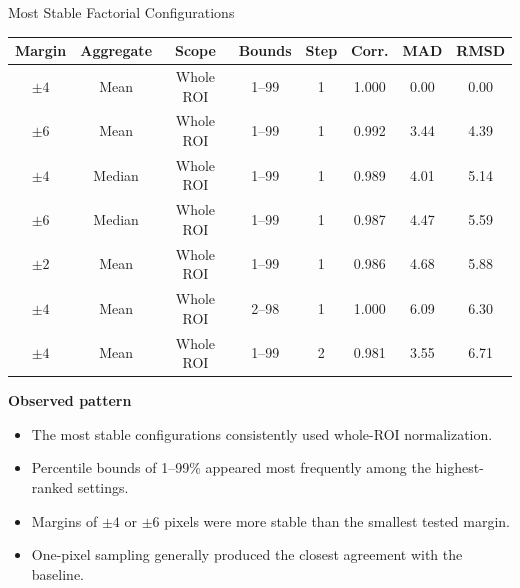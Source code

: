 \documentclass[aspectratio=169]{beamer}
\begin{document}
\begin{frame}{Most Stable Factorial Configurations}

\scriptsize

\begin{table}
\centering
\begin{tabular}{cccccccc}
\toprule
Margin &
Aggregate &
Scope &
Bounds &
Step &
Corr. &
MAD &
RMSD\\
\midrule
$\pm4$ & Mean & Whole ROI & 1--99 & 1 & 1.000 & 0.00 & 0.00\\
$\pm6$ & Mean & Whole ROI & 1--99 & 1 & 0.992 & 3.44 & 4.39\\
$\pm4$ & Median & Whole ROI & 1--99 & 1 & 0.989 & 4.01 & 5.14\\
$\pm6$ & Median & Whole ROI & 1--99 & 1 & 0.987 & 4.47 & 5.59\\
$\pm2$ & Mean & Whole ROI & 1--99 & 1 & 0.986 & 4.68 & 5.88\\
$\pm4$ & Mean & Whole ROI & 2--98 & 1 & 1.000 & 6.09 & 6.30\\
$\pm4$ & Mean & Whole ROI & 1--99 & 2 & 0.981 & 3.55 & 6.71\\
\bottomrule
\end{tabular}
\end{table}

\vspace{0.25cm}

\textbf{Observed pattern}

\begin{itemize}
    \item The most stable configurations consistently used whole-ROI
    normalization.
    \item Percentile bounds of 1--99\% appeared most frequently among the
    highest-ranked settings.
    \item Margins of $\pm4$ or $\pm6$ pixels were more stable than the smallest
    tested margin.
    \item One-pixel sampling generally produced the closest agreement with the
    baseline.
\end{itemize}

\end{frame}
\end{document}
